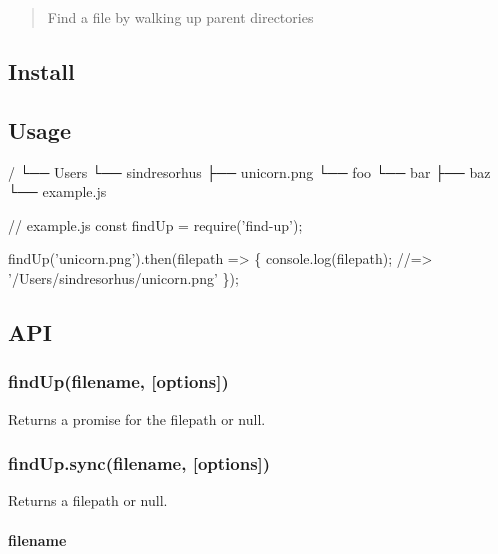 \begin{quote}
Find a file by walking up parent directories \end{quote}


\subsection*{Install}




\subsection*{Usage}


\begin{DoxyCode}
/
└── Users
    └── sindresorhus
        ├── unicorn.png
        └── foo
            └── bar
                ├── baz
                └── example.js
\end{DoxyCode}



\begin{DoxyCode}
// example.js
const findUp = require('find-up');

findUp('unicorn.png').then(filepath => \{
    console.log(filepath);
    //=> '/Users/sindresorhus/unicorn.png'
\});
\end{DoxyCode}


\subsection*{A\+PI}

\subsubsection*{find\+Up(filename, \mbox{[}options\mbox{]})}

Returns a promise for the filepath or {\ttfamily null}.

\subsubsection*{find\+Up.\+sync(filename, \mbox{[}options\mbox{]})}

Returns a filepath or {\ttfamily null}.

\paragraph*{filename}

